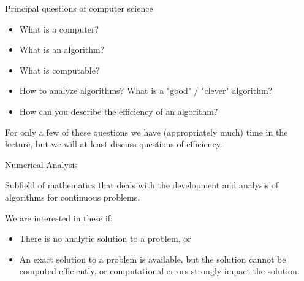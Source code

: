 \documentclass[11pt,compress,t,notes=noshow, xcolor=table]{beamer}
\begin{document}












\begin{vbframe}{Principal questions of computer science}
\begin{itemize}
  \item What is a computer?
  \item What is an algorithm?
  \item What is computable?
  \item How to analyze algorithms? What is
    a "good" / "clever" algorithm?
  \item How can you describe the efficiency of an algorithm?
\end{itemize}

\lz

For only a few of these questions we have (appropriately much) time in the lecture, but we will at least discuss questions of efficiency.

\end{vbframe}

\begin{vbframe}{Numerical Analysis}

Subfield of mathematics that deals with the development and analysis of algorithms for continuous problems.

\lz

We are interested in these if:
\begin{itemize}
\item There is no analytic solution to a problem, or
\item An exact solution to a problem is available, but the solution cannot be computed efficiently,
  or computational errors strongly impact the solution.
\end{itemize}
\end{vbframe}
\end{document}
